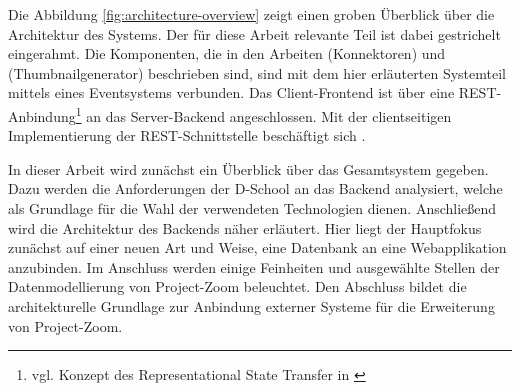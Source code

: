 Die Abbildung \ref{fig:architecture-overview} zeigt einen groben Überblick über die Architektur des Systems. Der für diese Arbeit relevante Teil ist dabei gestrichelt eingerahmt. Die Komponenten, die in den Arbeiten \cite{bp-tewe} (Konnektoren) und \cite{bp-dome} (Thumbnailgenerator) beschrieben sind, sind mit dem hier erläuterten Systemteil mittels eines Eventsystems verbunden. Das Client-Frontend ist über eine REST-Anbindung\footnote{vgl. Konzept des Representational State Transfer in \cite{rest}} an das Server-Backend angeschlossen. Mit der clientseitigen Implementierung der REST-Schnittstelle beschäftigt sich \cite{bp-norman}.

In dieser Arbeit wird zunächst ein Überblick über das Gesamtsystem gegeben. Dazu werden die Anforderungen der D-School an das Backend analysiert, welche als Grundlage für die Wahl der verwendeten Technologien dienen. Anschließend wird die Architektur des Backends näher erläutert. Hier liegt der Hauptfokus zunächst auf einer neuen Art und Weise, eine Datenbank an eine Webapplikation anzubinden. Im Anschluss werden einige Feinheiten und ausgewählte Stellen der Datenmodellierung von Project-Zoom beleuchtet. Den Abschluss bildet die architekturelle Grundlage zur Anbindung externer Systeme für die Erweiterung von Project-Zoom.